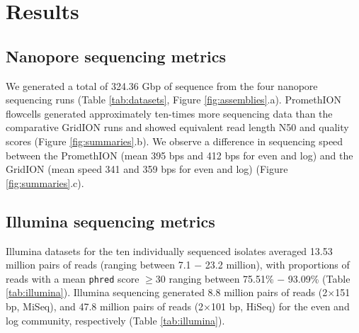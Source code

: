 \documentclass[a4paper,num-refs]{oup-contemporary}
\begin{document}
\section{Results}

\subsection{Nanopore sequencing metrics}

We generated a total of 324.36 Gbp of sequence from the four nanopore sequencing runs (Table \ref{tab:datasets}, Figure \ref{fig:assemblies}.a).
PromethION flowcells generated approximately ten-times more sequencing data than the comparative GridION runs and showed equivalent read length N50 and quality scores (Figure \ref{fig:summaries}.b).
We observe a difference in sequencing speed between the PromethION (mean 395 bps and 412 bps for even and log) and the GridION (mean speed 341 and 359 bps for even and log) (Figure \ref{fig:summaries}.c).

\subsection{Illumina sequencing metrics}

Illumina datasets for the ten individually sequenced isolates averaged 13.53 million pairs of reads (ranging between 7.1 $-$ 23.2 million), with proportions of reads with a mean \texttt{phred} score $\geq$30 ranging between 75.51\% $-$ 93.09\% (Table \ref{tab:illumina}).
Illumina sequencing generated 8.8 million pairs of reads (2$\times$151 bp, MiSeq), and 47.8 million pairs of reads (2$\times$101 bp, HiSeq) for the even and log community, respectively (Table \ref{tab:illumina}).

\end{document}
